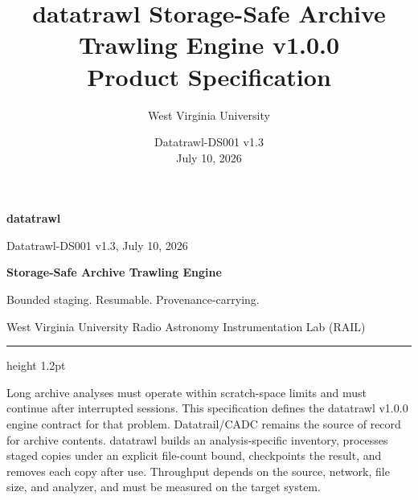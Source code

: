 \documentclass[10pt,letterpaper]{article}
\title{datatrawl Storage-Safe Archive Trawling Engine v1.0.0\\Product Specification}
\author{West Virginia University}
\date{Datatrawl-DS001 v1.3 \\ July 10, 2026}
\begin{document}
\thispagestyle{fancy}
{\sffamily
\begin{minipage}[t]{0.39\textwidth}
  {\fontsize{24}{26}\selectfont\bfseries\color{TrawlAmber}datatrawl}\par
  {\small Datatrawl-DS001 v1.3, July 10, 2026}
\end{minipage}%
\begin{minipage}[t]{0.61\textwidth}
  \raggedleft
  {\large\bfseries Storage-Safe Archive Trawling Engine}\par
  {\small Bounded staging. Resumable. Provenance-carrying.}\par
  {\small West Virginia University Radio Astronomy Instrumentation Lab (RAIL)}
\end{minipage}
}
\vspace{6pt}
{\color{TrawlAmber}\hrule height 1.2pt}
\vspace{8pt}

{\small\color{TrawlGray}Long archive analyses must operate within scratch-space
limits and must continue after interrupted sessions. This specification defines
the datatrawl v1.0.0 engine contract for that problem. Datatrail/CADC remains
the source of record for archive contents. datatrawl builds an
analysis-specific inventory, processes staged copies under an explicit
file-count bound, checkpoints the result, and removes each copy after use.
Throughput depends on the source, network, file size, and analyzer, and must be
measured on the target system.}
\end{document}
